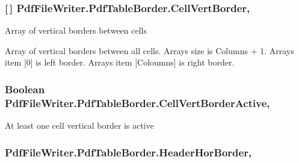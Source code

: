 \subsubsection[{\texorpdfstring{Cell\+Vert\+Border}{CellVertBorder}}]{ \mbox{[}$\,$\mbox{]} Pdf\+File\+Writer.\+Pdf\+Table\+Border.\+Cell\+Vert\+Border\hspace{0.3cm}{\ttfamily [get]}, {\ttfamily [set]}}\hypertarget{class_pdf_file_writer_1_1_pdf_table_border_a99c9500b6f848de866e4455d6201c1cb}{}\label{class_pdf_file_writer_1_1_pdf_table_border_a99c9500b6f848de866e4455d6201c1cb}


Array of vertical borders between cells 

Array of vertical borders between all cells. Array\textquotesingle{}s size is Columns + 1. Array\textquotesingle{}s item \mbox{[}0\mbox{]} is left border. Array\textquotesingle{}s item \mbox{[}Coloumns\mbox{]} is right border. 
\subsubsection[{\texorpdfstring{Cell\+Vert\+Border\+Active}{CellVertBorderActive}}]{\setlength{\rightskip}{0pt plus 5cm}Boolean Pdf\+File\+Writer.\+Pdf\+Table\+Border.\+Cell\+Vert\+Border\+Active\hspace{0.3cm}{\ttfamily [get]}, {\ttfamily [set]}}\hypertarget{class_pdf_file_writer_1_1_pdf_table_border_a04806358015eba8554e79a058e316741}{}\label{class_pdf_file_writer_1_1_pdf_table_border_a04806358015eba8554e79a058e316741}


At least one cell vertical border is active 

\subsubsection[{\texorpdfstring{Header\+Hor\+Border}{HeaderHorBorder}}]{ Pdf\+File\+Writer.\+Pdf\+Table\+Border.\+Header\+Hor\+Border\hspace{0.3cm}{\ttfamily [get]}, {\ttfamily [set]}}\hypertarget{class_pdf_file_writer_1_1_pdf_table_border_ab7da822c405dcf2488ac767f60559bc4}{}\label{class_pdf_file_writer_1_1_pdf_table_border_ab7da822c405dcf2488ac767f60559bc4}


